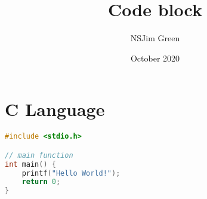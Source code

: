 \documentclass{article}
\title{Code block}
\author{NSJim Green}
\date{October 2020}
\begin{document}
\maketitle

\section{C Language}

\begin{lstlisting}[language=c]
#include <stdio.h>

// main function
int main() {
    printf("Hello World!");
    return 0;
}
\end{lstlisting}
\end{document}
